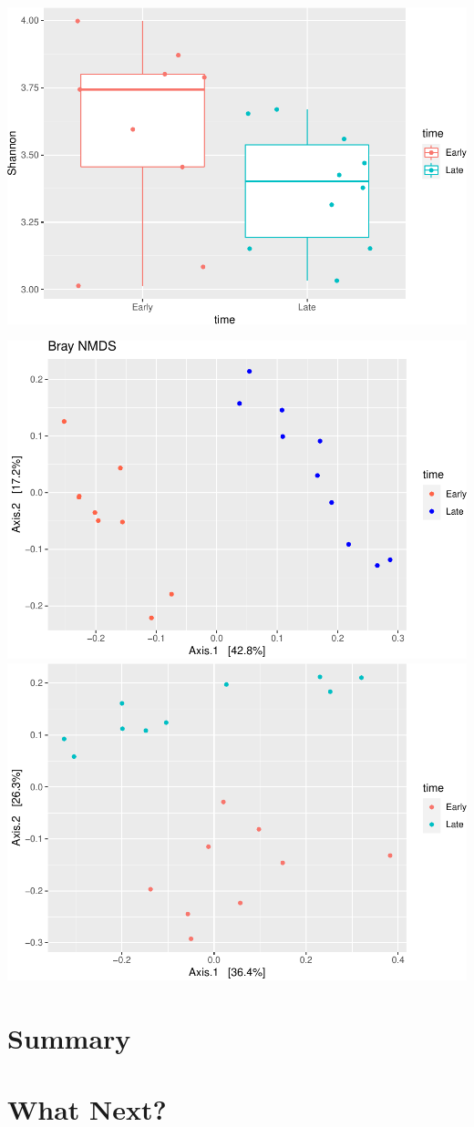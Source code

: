 \documentclass[
]{book}
\begin{document}
\includegraphics{16sworkshop_files/figure-latex/alpha diversit-1.pdf}

\includegraphics{16sworkshop_files/figure-latex/unnamed-chunk-3-1.pdf} \includegraphics{16sworkshop_files/figure-latex/unnamed-chunk-3-2.pdf}

\hypertarget{summary}{%
\chapter{Summary}\label{summary}}

\hypertarget{what-next}{%
\chapter{What Next?}\label{what-next}}

  
\end{document}
